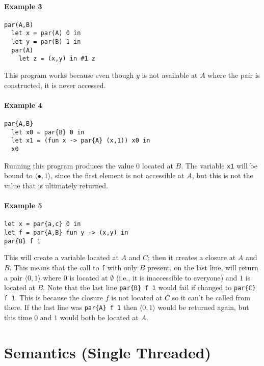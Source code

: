 \documentclass[10pt]{article}
\newcommand{\epair}[2]{\ensuremath{\langle {#1}, {#2} \rangle}}
\newcommand{\vcrash}{\ensuremath{\bullet}}
\begin{document}
\paragraph{Example 3}
\begin{verbatim}
par(A,B) 
  let x = par(A) 0 in
  let y = par(B) 1 in
  par(A) 
    let z = (x,y) in #1 z
\end{verbatim}
This program works because even though $y$ is not available at $A$
where the pair is constructed, it is never accessed.

\paragraph{Example 4}
\begin{verbatim}
par{A,B}
  let x0 = par{B} 0 in
  let x1 = (fun x -> par{A} (x,1)) x0 in
  x0
\end{verbatim}
Running this program produces the value $0$ located at $B$. The
variable \texttt{x1} will be bound to $\epair{\vcrash}{1}$, since the
first element is not accessible at $A$, but this is not the value that
is ultimately returned.

\paragraph{Example 5}
\begin{verbatim}
let x = par{a,c} 0 in
let f = par{A,B} fun y -> (x,y) in
par{B} f 1
\end{verbatim}
This will create a variable located at $A$ and $C$; then it creates a
closure at $A$ and $B$. This means that the call to \texttt{f} with
only $B$ present, on the last line, will return a pair $\epair{0}{1}$
where $0$ is located at $\emptyset$ (i.e., it is inaccessible to
everyone) and $1$ is located at $B$. Note that the last line
\texttt{par\{B\} f 1} would fail if changed to \texttt{par\{C\} f
  1}. This is because the closure $f$ is not located at $C$ so it
can't be called from there. If the last line was \texttt{par\{A\} f 1}
then $\epair{0}{1}$ would be returned again, but this time $0$ and $1$
would both be located at $A$.

\section{Semantics (Single Threaded)}
\label{sec:STsemantics}
\end{document}
